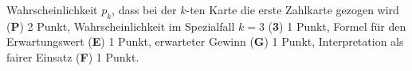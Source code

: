 \begin{bewertung}
Wahrscheinlichkeit $p_k$, dass bei der $k$-ten Karte die erste
Zahlkarte gezogen wird ({\bf P}) 2 Punkt,
Wahrscheinlichkeit im Spezialfall $k=3$ ({\bf 3}) 1 Punkt,
Formel für den Erwartungswert ({\bf E}) 1 Punkt,
erwarteter Gewinn ({\bf G}) 1 Punkt,
Interpretation als fairer Einsatz ({\bf F}) 1 Punkt.
\end{bewertung}

